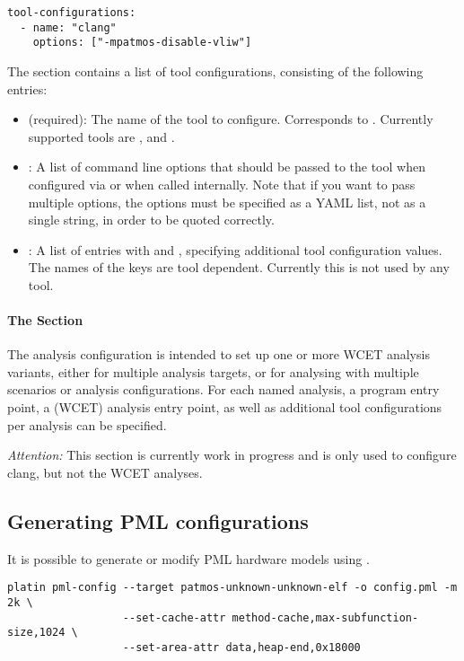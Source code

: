 \begin{verbatim}
tool-configurations:
  - name: "clang"
    options: ["-mpatmos-disable-vliw"]
\end{verbatim}

The section contains a list of tool configurations, consisting of the following entries:
\begin{itemize}
\item {} (required): The name of the tool to configure. Corresponds to . Currently supported
  tools are ,  and . 
\item {}: A list of command line options that should be passed to the tool when configured via  or 
  when called internally. Note that if you want to pass multiple options, the options must be specified as a YAML list, not as a 
  single string, in order to be quoted correctly.
\item {}: A list of entries with  and , specifying additional tool configuration values.
  The names of the keys are tool dependent. 
  Currently this is not used by any tool.
\end{itemize}

\paragraph{The  Section}

The analysis configuration is intended to set up one or more WCET analysis variants, either for 
multiple analysis targets, or for analysing with multiple scenarios or analysis configurations.
For each named analysis, a program entry point, a (WCET) analysis entry point, as well as additional tool configurations
per analysis can be specified.

\emph{Attention:} This section is currently work in progress and is only used to configure clang, but not the WCET analyses.


\subsection{Generating PML configurations}

It is possible to generate or modify PML hardware models using .

\begin{verbatim}
platin pml-config --target patmos-unknown-unknown-elf -o config.pml -m 2k \
                  --set-cache-attr method-cache,max-subfunction-size,1024 \
                  --set-area-attr data,heap-end,0x18000
\end{verbatim}


